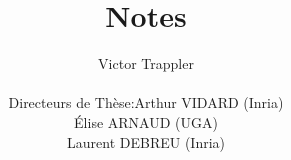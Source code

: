 \documentclass[a4paper,11pt]{article}
\newcommand{\Ex}{\mathbb{E}}
\theoremstyle{defi}
\numberwithin{thmCounter}{section}
\begin{document}
\title{Notes}

\author{Victor Trappler \\[1cm]
  \begin{tabular}{lr}
    Directeurs de Thèse: & Arthur VIDARD (Inria) \\
                        & Élise ARNAUD (UGA)\\
                        & Laurent DEBREU (Inria)
  \end{tabular}
}

\maketitle

\showthe\columnwidth



\end{document}
